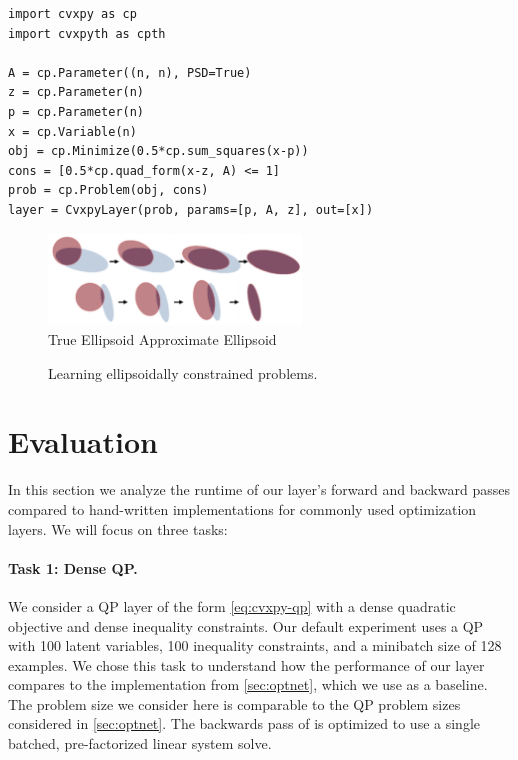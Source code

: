 \begin{lstlisting}
import cvxpy as cp
import cvxpyth as cpth

A = cp.Parameter((n, n), PSD=True)
z = cp.Parameter(n)
p = cp.Parameter(n)
x = cp.Variable(n)
obj = cp.Minimize(0.5*cp.sum_squares(x-p))
cons = [0.5*cp.quad_form(x-z, A) <= 1]
prob = cp.Problem(obj, cons)
layer = CvxpyLayer(prob, params=[p, A, z], out=[x])
\end{lstlisting}

\begin{figure}[t]
  \centering
  \includegraphics[width=0.6\textwidth]{ellipsoid-frames.png} \\
   True Ellipsoid \enskip
   Approximate Ellipsoid
  \caption{
    Learning ellipsoidally constrained problems.
  }
  \label{fig:ellipsoid-results}
\end{figure}

\newpage
\section{Evaluation}
\label{sec:eval}

In this section we analyze the runtime of our layer's forward
and backward passes compared to hand-written implementations
for commonly used optimization layers.
We will focus on three tasks:

\paragraph{Task 1: Dense QP.}
We consider a QP layer of the form
\cref{eq:cvxpy-qp} with a dense quadratic objective
and dense inequality constraints.
Our default experiment uses a QP with 100 latent
variables, 100 inequality constraints, and
a minibatch size of 128 examples.
We chose this task to understand how the performance
of our \cvxpy{} layer compares to the \qpth implementation
from \cref{sec:optnet}, which we use as a baseline.
The problem size we consider here is comparable
to the QP problem sizes considered in \cref{sec:optnet}.
The backwards pass of \qpth is optimized to use a single
batched, pre-factorized linear system solve.

